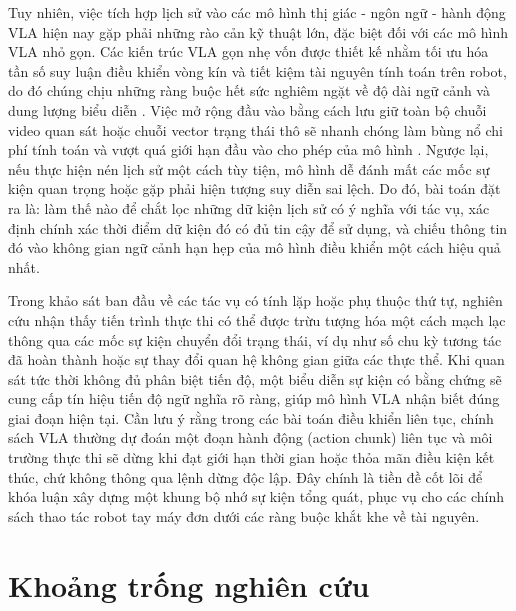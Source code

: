 Tuy nhiên, việc tích hợp lịch sử vào các mô hình thị giác - ngôn ngữ - hành động VLA hiện nay gặp phải những rào cản kỹ thuật lớn, đặc biệt đối với các mô hình VLA nhỏ gọn. Các kiến trúc VLA gọn nhẹ vốn được thiết kế nhằm tối ưu hóa tần số suy luận điều khiển vòng kín và tiết kiệm tài nguyên tính toán trên robot, do đó chúng chịu những ràng buộc hết sức nghiêm ngặt về độ dài ngữ cảnh và dung lượng biểu diễn \cite{smolvla2025}. Việc mở rộng đầu vào bằng cách lưu giữ toàn bộ chuỗi video quan sát hoặc chuỗi vector trạng thái thô sẽ nhanh chóng làm bùng nổ chi phí tính toán và vượt quá giới hạn đầu vào cho phép của mô hình \cite{mem2026}. Ngược lại, nếu thực hiện nén lịch sử một cách tùy tiện, mô hình dễ đánh mất các mốc sự kiện quan trọng hoặc gặp phải hiện tượng suy diễn sai lệch. Do đó, bài toán đặt ra là: làm thế nào để chắt lọc những dữ kiện lịch sử có ý nghĩa với tác vụ, xác định chính xác thời điểm dữ kiện đó có đủ tin cậy để sử dụng, và chiếu thông tin đó vào không gian ngữ cảnh hạn hẹp của mô hình điều khiển một cách hiệu quả nhất.

Trong khảo sát ban đầu về các tác vụ có tính lặp hoặc phụ thuộc thứ tự, nghiên cứu nhận thấy tiến trình thực thi có thể được trừu tượng hóa một cách mạch lạc thông qua các mốc sự kiện chuyển đổi trạng thái, ví dụ như số chu kỳ tương tác đã hoàn thành hoặc sự thay đổi quan hệ không gian giữa các thực thể. Khi quan sát tức thời không đủ phân biệt tiến độ, một biểu diễn sự kiện có bằng chứng sẽ cung cấp tín hiệu tiến độ ngữ nghĩa rõ ràng, giúp mô hình VLA nhận biết đúng giai đoạn hiện tại. Cần lưu ý rằng trong các bài toán điều khiển liên tục, chính sách VLA thường dự đoán một đoạn hành động (action chunk) liên tục và môi trường thực thi sẽ dừng khi đạt giới hạn thời gian hoặc thỏa mãn điều kiện kết thúc, chứ không thông qua lệnh dừng độc lập. Đây chính là tiền đề cốt lõi để khóa luận xây dựng một khung bộ nhớ sự kiện tổng quát, phục vụ cho các chính sách thao tác robot tay máy đơn dưới các ràng buộc khắt khe về tài nguyên.

\section{Khoảng trống nghiên cứu}

